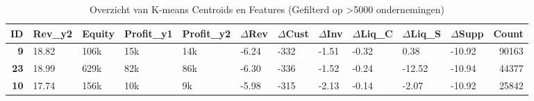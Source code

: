 \begin{table}[ht]
    \centering
    \caption{Overzicht van K-means Centroids en Features (Gefilterd op >5000 ondernemingen)}
    \label{tab:features_k_means}
    \setlength{\tabcolsep}{2pt} %
    \begin{tabularx}{\textwidth}{@{} r *{10}{X} r @{}}
        \toprule
        \textbf{ID} & \textbf{Rev\_y2} & \textbf{Equity} & \textbf{Profit\_y1} & \textbf{Profit\_y2} & \textbf{$\Delta$Rev} & \textbf{$\Delta$Cust} & \textbf{$\Delta$Inv} & \textbf{$\Delta$Liq\_C} & \textbf{$\Delta$Liq\_S} & \textbf{$\Delta$Supp} & \textbf{Count} \\
        \midrule
        \footnotesize \textbf{9} & 
        \cellcolor[HTML]{F9FCFA}\footnotesize 18.82 & 
        \cellcolor[HTML]{FFFFFF}\footnotesize 106k & 
        \cellcolor[HTML]{FFFFFF}\footnotesize 15k & 
        \cellcolor[HTML]{FFFFFF}\footnotesize 14k & 
        \cellcolor[HTML]{FCFEFD}\footnotesize -6.24 & 
        \cellcolor[HTML]{FDFFFE}\footnotesize -332 & 
        \cellcolor[HTML]{E0F3E9}\footnotesize -1.51 & 
        \footnotesize -0.32 & 
        \cellcolor[HTML]{A8DCC2}\footnotesize 0.38 & 
        \cellcolor[HTML]{F3FBF7}\footnotesize -10.92 & 
        \footnotesize 90163 \\
        
        \footnotesize \textbf{23} & 
        \cellcolor[HTML]{FBFDFC}\footnotesize 18.99 & 
        \cellcolor[HTML]{FAFDFC}\footnotesize 629k & 
        \cellcolor[HTML]{F8FDFA}\footnotesize 82k & 
        \cellcolor[HTML]{F7FCFA}\footnotesize 86k & 
        \cellcolor[HTML]{FEFFFE}\footnotesize -6.30 & 
        \cellcolor[HTML]{FEFFFE}\footnotesize -336 & 
        \cellcolor[HTML]{E0F3E9}\footnotesize -1.52 & 
        \footnotesize -0.24 & 
        \cellcolor[HTML]{FFFFFF}\footnotesize -12.52 & 
        \cellcolor[HTML]{F3FBF7}\footnotesize -10.94 & 
        \footnotesize 44377 \\

        \footnotesize \textbf{10} & 
        \cellcolor[HTML]{E9F6EF}\footnotesize 17.74 & 
        \cellcolor[HTML]{FFFFFF}\footnotesize 156k & 
        \cellcolor[HTML]{FFFFFF}\footnotesize 10k & 
        \cellcolor[HTML]{FFFFFF}\footnotesize 9k & 
        \cellcolor[HTML]{F5FBF8}\footnotesize -5.98 & 
        \cellcolor[HTML]{F9FDFB}\footnotesize -315 & 
        \cellcolor[HTML]{E3F4EB}\footnotesize -2.13 & 
        \footnotesize -0.14 & 
        \cellcolor[HTML]{B8E3CE}\footnotesize -2.07 & 
        \cellcolor[HTML]{F3FBF7}\footnotesize -10.92 & 
        \footnotesize 25842 \\


\end{tabularx}
\end{table}
